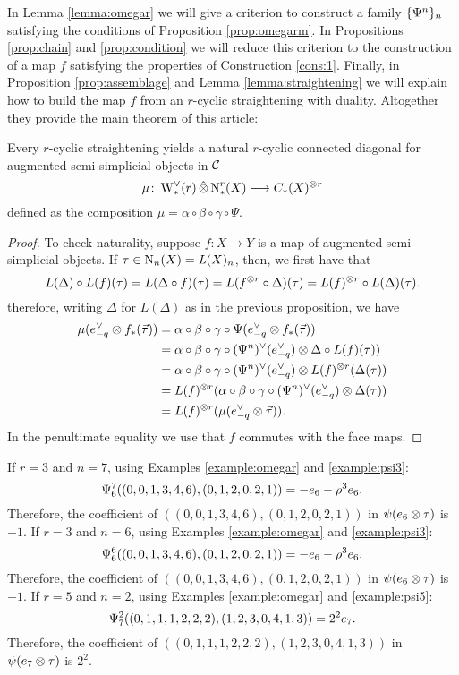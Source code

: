 In Lemma \ref{lemma:omegar} we will give a criterion to construct a family $\{\Psiom^n\}_n$ satisfying the conditions of Proposition \ref{prop:omegarm}. In Propositions \ref{prop:chain} and \ref{prop:condition} we will reduce this criterion to the construction of a map $f$ satisfying the properties of Construction \ref{cons:1}. Finally, in Proposition \ref{prop:assemblage} and Lemma \ref{lemma:straightening} we will explain how to build the map $f$ from an $r$-cyclic straightening with duality. Altogether they provide the main theorem of this article:

\begin{theorem}\label{thm2:mainthm} Every $r$-cyclic straightening yields a natural $r$-cyclic connected diagonal for augmented semi-simplicial objects in $\cC$
\[
	\mu \colon \rWd(r) \hotimes \rchains(X) \lra \ucadenas(X)^{\ot r}
\]
defined as the composition
	$
	\mu = \alpha\circ\beta\circ\gamma\circ \Psi.
	$
\end{theorem}

\begin{proof}
	To check naturality, suppose $f \colon X \to Y$ is a map of augmented semi-simplicial objects. If $\tau\in \chains[n](X) = \abel(X)_n$, then, we first have that
	\[
		L(\Delta)\circ L(f)(\tau) = L(\Delta\circ f)(\tau) = L(f^{\ot r}\circ \Delta)(\tau) = L(f)^{\ot r}\circ L(\Delta)(\tau).
	\]
	therefore, writing $\Delta$ for $L(\Delta)$ as in the previous proposition, we have
	\begin{align*}
	\mu(e^\dd_{-q} \ot f_*(\vec{\tau}))
		&=	\alpha\circ\beta\circ\gamma\circ \Psi(e_{-q}^\vee \ot f_*(\vec{\tau}))
		\\
		&= \alpha\circ\beta\circ\gamma\circ(\Psiom^n)^\vee(e_{-q}^\vee) \ot \Delta\circ L(f)(\tau))
		\\
		&= \alpha\circ\beta\circ\gamma\circ(\Psiom^n)^\vee(e_{-q}^\vee) \ot L(f)^{\ot r}(\Delta(\tau))
		\\
		&= L(f)^{\ot r}(\alpha\circ\beta\circ\gamma\circ(\Psiom^n)^\vee(e_{-q}^\vee) \ot \Delta(\tau))
		\\
		&= L(f)^{\ot r}(\mu(e^\dd_{-q} \ot \vec{\tau})).
	\end{align*}
	In the penultimate equality we use that $f$ commutes with the face maps.
\end{proof}

\begin{example}\label{ex:omegarn} If $r=3$ and $n=7$, using Examples \ref{example:omegar} and \ref{example:psi3}:
	\[
		\Psiom_6^7((0,0,1,3,4,6),(0,1,2,0,2,1)) = -e_6-\rho^3e_6.
	\]
	Therefore, the coefficient of $((0,0,1,3,4,6),(0,1,2,0,2,1))$ in $\psi(e_6 \ot \tau)$ is $-1$.
 If $r=3$ and $n=6$, using Examples \ref{example:omegar} and \ref{example:psi3}:
	\[
		\Psiom_6^6((0,0,1,3,4,6),(0,1,2,0,2,1)) = -e_6-\rho^3e_6.
	\]
	Therefore, the coefficient of $((0,0,1,3,4,6),(0,1,2,0,2,1))$ in $\psi(e_6 \ot \tau)$ is $-1$.
 If $r=5$ and $n=2$, using Examples \ref{example:omegar} and \ref{example:psi5}:
	\[
		\Psiom_7^2((0,1,1,1,2,2,2),(1,2,3,0,4,1,3)) = 2^2e_7.
	\]
Therefore, the coefficient of $((0,1,1,1,2,2,2),(1,2,3,0,4,1,3))$ in $\psi(e_7 \ot \tau)$ is $2^2$.
\end{example}

